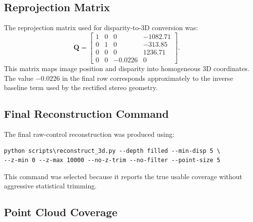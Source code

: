 \documentclass[11pt,a4paper]{article}
\newcommand{\mat}[1]{\mathbf{#1}}
\begin{document}
\subsection{Reprojection Matrix}

The reprojection matrix used for disparity-to-3D conversion was:
\begin{equation}
\mat{Q}=\begin{bmatrix}
1 & 0 & 0 & -1082.71 \\
0 & 1 & 0 & -313.85 \\
0 & 0 & 0 & 1236.71 \\
0 & 0 & -0.0226 & 0
\end{bmatrix}.
\end{equation}
This matrix maps image position and disparity into homogeneous 3D coordinates. The value \(-0.0226\) in the final row corresponds approximately to the inverse baseline term used by the rectified stereo geometry.

\subsection{Final Reconstruction Command}

The final raw-control reconstruction was produced using:
\begin{verbatim}
python scripts\reconstruct_3d.py --depth filled --min-disp 5 \
--z-min 0 --z-max 10000 --no-z-trim --no-filter --point-size 5
\end{verbatim}
This command was selected because it reports the true usable coverage without aggressive statistical trimming.

\subsection{Point Cloud Coverage}
\end{document}
